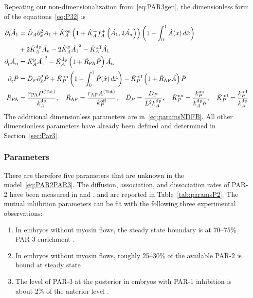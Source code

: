 \documentclass[11pt]{article}
\newcommand{\6}[1]{#1_{\text{6}}}
\newcommand{\3}[1]{#1_{\text{3}}}
\newcommand{\Tot}[1]{#1^\text{(Tot)}}
\newcommand{\A}[1]{#1_A}
\begin{document}
Repeating our non-dimensionalization from\ \eqref{eq:PAR3gen}, the dimensionless form of the equations\ \eqref{eq:P32} is
\begin{subequations}
\label{eq:PAR2PAR3}
\begin{align}
\nonumber
\Dthat \hat{\MA} & = \DhatA \Dxhat^2 \MA +\KhatonA \left(1+\KhatfA \A{f}^+\left(\hat{\MA},2\hat{\PA}\right)\right)\left(1 - \int_0^1 \hat{A}(x) \, d\hat{x} \right) \\ 
&+ 2\KhatdpA \hat{\PA}-2\KhatpA \hat{\MA}^2 - \KhatoffA \hat{\MA} \\ 
\Dthat \hat{\PA} & =\KhatpA \hat{\MA}^2- \KhatdpA \left(1+\hat{R}_\text{PA}\hat{P}\right) \hat{\PA} \\ 
\Dthat \hat{P} & =\DhatP \Dxhat^2 \hat{P} +\KhatonP \left(1 - \int_0^1 \hat{P}(\hat x) \, d\hat{x} \right)  - \KhatoffP \left(1+\hat{R}_\text{AP}\hat{A}\right)\hat{P} \\ 
\label{eq:paramsNDFB}
\hat{R}_\text{PA}&=\frac{r_\text{PA} \Tot{P}}{\kdp_A},\quad \hat{R}_\text{AP}=\frac{r_\text{AP} \Tot{A}}{\koff_P},\quad \DhatP =\frac{D_P}{L^2 \A{\kdp}}, \quad \KhatonP=\frac{{\kon_P}}{\A{\kdp} h },\quad \KhatoffP = \frac{\koff_P}{\kdp_A}
\end{align}
\end{subequations}
The additional dimensionless parameters are in\ \eqref{eq:paramsNDFB}. All other dimensionless parameters have already been defined and determined in Section\ \ref{sec:Par3}.

\subsubsection{Parameters}
There are therefore five parameters that are unknown in the model\ \eqref{eq:PAR2PAR3}. The diffusion, association, and dissociation rates of PAR-2 have been measured in \cite{goehring2011polarization} and \cite{gross2019guiding}, and are reported in Table\ \ref{tab:paramsP2}. The mutual inhibition parameters can be fit with the following three experimental observations:
\begin{enumerate}
\item In embryos without myosin flows, the steady state boundary is at 70--75\% PAR-3 enrichment \cite[Fig.~5B]{zonies2010symmetry}.
\item In embryos without myosin flows, roughly 25--30\% of the available PAR-2 is bound at steady state \cite[Fig.~S3]{gross2019guiding}. 
\item The level of PAR-3 at the posterior in embryos with PAR-1 inhibition is about 2\% of the anterior level \cite[Fig.~4C]{sailer2015dynamic}.
\end{enumerate}
\end{document}
